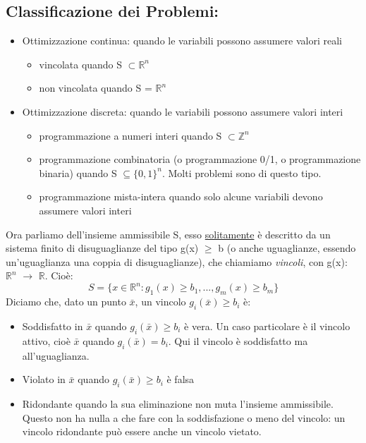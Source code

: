 \subsection{Classificazione dei Problemi:} 
\begin{itemize}
    \item Ottimizzazione continua: quando le variabili possono assumere valori reali
    \begin{itemize}
        \item vincolata quando S $\subset \mathbb{R}^n$
        \item non vincolata quando S = $\mathbb{R}^n$
    \end{itemize}
    \item Ottimizzazione discreta: quando le variabili possono assumere valori interi
    \begin{itemize}
        \item programmazione a numeri interi quando S $\subset \mathbb{Z}^n$
        \item programmazione combinatoria (o programmazione 0/1, o programmazione binaria) quando S $\subseteq \{0,1\}^n$. Molti problemi sono di questo tipo.
        \item programmazione mista-intera quando solo alcune variabili devono assumere valori interi
    \end{itemize}
\end{itemize}
Ora parliamo dell'insieme ammissibile S, esso \underline{solitamente} è descritto da un sistema finito di disuguaglianze del tipo g(x) $\geq$ b (o anche uguaglianze, essendo un'uguaglianza una coppia di disuguaglianze), che chiamiamo \textit{vincoli}, con g(x): $\mathbb{R}^n$ $\to$ $\mathbb{R}$. Cioè:
\begin{equation*}
    S = \{x \in \mathbb{R}^n: g_1(x) \geq b_1, ..., g_m(x) \geq b_m\}
\end{equation*}
Diciamo che, dato un punto $\bar{x}$, un vincolo $g_i(\bar{x}) \geq b_i$ è:
\begin{itemize}
    \item Soddisfatto in $\bar{x}$ quando $g_i(\bar{x}) \geq b_i$ è vera. Un caso particolare è il vincolo attivo, cioè $\bar{x}$ quando $g_i(\bar{x}) = b_i$. Qui il vincolo è soddisfatto ma all'uguaglianza.
    \item Violato in $\bar{x}$ quando $g_i(\bar{x}) \geq b_i$ è falsa
    \item Ridondante quando la sua eliminazione non muta l'insieme ammissibile. Questo non ha nulla a che fare con la soddisfazione o meno del vincolo: un vincolo ridondante può essere anche un vincolo vietato.
\end{itemize}
